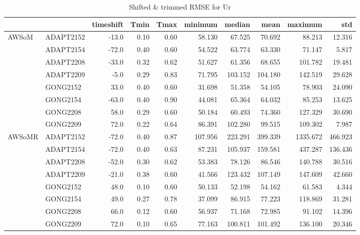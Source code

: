 \begin{table}
\centering
\caption{Shifted \& trimmed RMSE for Ur}
\begin{tabular}{llrrrrrrrr}
\toprule
       &          &  timeshift &  Tmin &  Tmax &  minimum &   median &     mean &   maximum &      std \\
\midrule
\multirow{8}{*}{AWSoM} & ADAPT2152 &      -13.0 &  0.10 &  0.60 &   58.130 &   67.525 &   70.692 &    88.213 &   12.316 \\
       & ADAPT2154 &      -72.0 &  0.40 &  0.60 &   54.522 &   63.774 &   63.330 &    71.147 &    5.817 \\
       & ADAPT2208 &      -33.0 &  0.32 &  0.62 &   51.627 &   61.356 &   68.655 &   101.782 &   19.481 \\
       & ADAPT2209 &       -5.0 &  0.29 &  0.83 &   71.795 &  103.152 &  104.180 &   142.519 &   29.628 \\
       & GONG2152 &       33.0 &  0.40 &  0.60 &   31.698 &   51.358 &   54.105 &    78.903 &   24.090 \\
       & GONG2154 &      -63.0 &  0.40 &  0.90 &   44.081 &   65.364 &   64.032 &    85.253 &   13.625 \\
       & GONG2208 &       58.0 &  0.29 &  0.60 &   50.184 &   60.493 &   74.360 &   127.329 &   30.690 \\
       & GONG2209 &       72.0 &  0.22 &  0.64 &   86.391 &  102.280 &   99.515 &   109.302 &    7.987 \\
\cline{1-10}
\multirow{8}{*}{AWSoMR} & ADAPT2152 &      -72.0 &  0.40 &  0.87 &  107.956 &  223.291 &  399.339 &  1335.672 &  466.923 \\
       & ADAPT2154 &      -72.0 &  0.40 &  0.63 &   87.231 &  105.937 &  159.581 &   437.287 &  136.436 \\
       & ADAPT2208 &      -52.0 &  0.30 &  0.62 &   53.383 &   78.126 &   86.546 &   140.788 &   30.516 \\
       & ADAPT2209 &      -21.0 &  0.38 &  0.60 &   41.566 &  123.432 &  107.149 &   147.609 &   42.660 \\
       & GONG2152 &       48.0 &  0.10 &  0.60 &   50.133 &   52.198 &   54.162 &    61.583 &    4.344 \\
       & GONG2154 &       49.0 &  0.27 &  0.78 &   37.099 &   86.915 &   77.223 &   118.869 &   31.281 \\
       & GONG2208 &       66.0 &  0.12 &  0.60 &   56.937 &   71.168 &   72.985 &    91.102 &   14.396 \\
       & GONG2209 &       72.0 &  0.10 &  0.65 &   77.163 &  100.811 &  101.492 &   136.100 &   20.346 \\
\bottomrule
\end{tabular}
\end{table}
